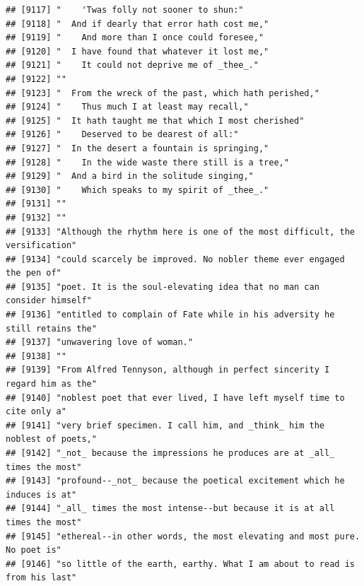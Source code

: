 \documentclass{article}\usepackage[]{graphicx}\usepackage[]{color}
\makeatletter
\newenvironment{kframe}{%
 \def\at@end@of@kframe{}%
 \ifinner\ifhmode%
  \def\at@end@of@kframe{\end{minipage}}%
  \begin{minipage}{\columnwidth}%
 \fi\fi%
 \def\FrameCommand##1{\hskip\@totalleftmargin \hskip-\fboxsep
 \colorbox{shadecolor}{##1}\hskip-\fboxsep
     \hskip-\linewidth \hskip-\@totalleftmargin \hskip\columnwidth}%
 \MakeFramed {\advance\hsize-\width
   \@totalleftmargin\z@ \linewidth\hsize
   \@setminipage}}%
 {\par\unskip\endMakeFramed%
 \at@end@of@kframe}
\newenvironment{knitrout}{}{} %
\makeatother
\begin{document}
\begin{knitrout}
\begin{kframe}
\begin{verbatim}
## [9117] "    'Twas folly not sooner to shun:"                                         
## [9118] "  And if dearly that error hath cost me,"                                    
## [9119] "    And more than I once could foresee,"                                     
## [9120] "  I have found that whatever it lost me,"                                    
## [9121] "    It could not deprive me of _thee_."                                      
## [9122] ""                                                                            
## [9123] "  From the wreck of the past, which hath perished,"                          
## [9124] "    Thus much I at least may recall,"                                        
## [9125] "  It hath taught me that which I most cherished"                             
## [9126] "    Deserved to be dearest of all:"                                          
## [9127] "  In the desert a fountain is springing,"                                    
## [9128] "    In the wide waste there still is a tree,"                                
## [9129] "  And a bird in the solitude singing,"                                       
## [9130] "    Which speaks to my spirit of _thee_."                                    
## [9131] ""                                                                            
## [9132] ""                                                                            
## [9133] "Although the rhythm here is one of the most difficult, the versification"    
## [9134] "could scarcely be improved. No nobler theme ever engaged the pen of"         
## [9135] "poet. It is the soul-elevating idea that no man can consider himself"        
## [9136] "entitled to complain of Fate while in his adversity he still retains the"    
## [9137] "unwavering love of woman."                                                   
## [9138] ""                                                                            
## [9139] "From Alfred Tennyson, although in perfect sincerity I regard him as the"     
## [9140] "noblest poet that ever lived, I have left myself time to cite only a"        
## [9141] "very brief specimen. I call him, and _think_ him the noblest of poets,"      
## [9142] "_not_ because the impressions he produces are at _all_ times the most"       
## [9143] "profound--_not_ because the poetical excitement which he induces is at"      
## [9144] "_all_ times the most intense--but because it is at all times the most"       
## [9145] "ethereal--in other words, the most elevating and most pure. No poet is"      
## [9146] "so little of the earth, earthy. What I am about to read is from his last"    

\end{verbatim}
\end{kframe}
\end{knitrout}
\end{document}
